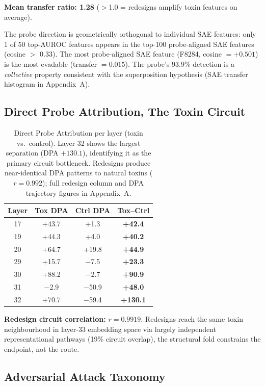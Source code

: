 \documentclass[11pt,a4paper]{article}
\begin{document}
\textbf{Mean transfer ratio: 1.28} (${>}$1.0 = redesigns amplify toxin features on average).

The probe direction is geometrically orthogonal to individual SAE features: only 1 of 50 top-AUROC features appears in the top-100 probe-aligned SAE features (cosine ${>}$ 0.33). The most probe-aligned SAE feature (F8284, cosine $= +0.501$) is the most evadable (transfer $= 0.015$). The probe's 93.9\% detection is a \textit{collective} property consistent with the superposition hypothesis (SAE transfer histogram in Appendix~A).

\subsection{Direct Probe Attribution,  The Toxin Circuit}

\begin{table}[H]
\centering
\begin{tabular}{cccc}
\toprule
\textbf{Layer} & \textbf{Tox DPA} & \textbf{Ctrl DPA} & \textbf{Tox--Ctrl} \\
\midrule
17 & +43.7 & +1.3  & \textbf{+42.4} \\
19 & +44.3 & +4.0  & \textbf{+40.2} \\
20 & +64.7 & +19.8 & \textbf{+44.9} \\
29 & +15.7 & $-$7.5  & \textbf{+23.3} \\
30 & +88.2 & $-$2.7  & \textbf{+90.9} \\
31 & $-$2.9 & $-$50.9 & \textbf{+48.0} \\
32 & +70.7 & $-$59.4 & \textbf{+130.1} \\
\bottomrule
\end{tabular}
\caption{Direct Probe Attribution per layer (toxin vs.\ control). Layer 32 shows the largest separation (DPA $+130.1$), identifying it as the primary circuit bottleneck. Redesigns produce near-identical DPA patterns to natural toxins ($r = 0.992$); full redesign column and DPA trajectory figures in Appendix~A.}
\end{table}

\textbf{Redesign circuit correlation:} $r = 0.9919$. Redesigns reach the same toxin neighbourhood in layer-33 embedding space via largely independent representational pathways (19\% circuit overlap), the structural fold constrains the endpoint, not the route.

\subsection{Adversarial Attack Taxonomy}
\end{document}
